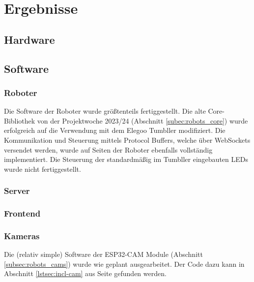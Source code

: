 \chapter{Ergebnisse}

\section{Hardware}

\section{Software}

\subsection{Roboter}
Die Software der Roboter wurde größtenteils fertiggestellt.
%
Die alte Core-Bibliothek von der Projektwoche 2023/24 (Abschnitt \ref{subec:robots_core})
wurde erfolgreich auf die Verwendung mit dem Elegoo Tumbller modifiziert.
%
Die Kommunikation und Steuerung mittels Protocol Buffers,
welche über WebSockets versendet werden,
wurde auf Seiten der Roboter ebenfalls vollständig implementiert.
%
Die Steuerung der standardmäßig im Tumbller eingebauten LEDs wurde nicht fertiggestellt.
\subsection{Server}

\subsection{Frontend}

\subsection{Kameras}
Die (relativ simple) Software der ESP32-CAM Module (Abschnitt \ref{subsec:robots_cams})
wurde wie geplant ausgearbeitet.
%
Der Code dazu kann in Abschnitt \ref{lstsec:incl-cam} aus Seite \pageref{lstsec:incl-cam} gefunden werden.
